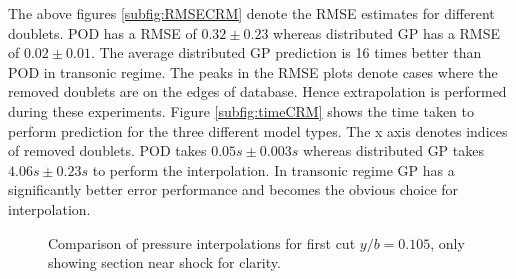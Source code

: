 The above figures \ref{subfig:RMSECRM} denote the RMSE estimates for different doublets. POD has a RMSE of \(0.32\pm0.23\) whereas distributed GP has a RMSE of \(0.02\pm0.01\). The average distributed GP prediction is 16 times better than POD in transonic regime. The peaks in the RMSE plots denote cases where the removed doublets are on the edges of database. Hence extrapolation is performed during these experiments. Figure \ref{subfig:timeCRM} shows the time taken to perform prediction for the three different model types. The x axis denotes indices of removed doublets. POD takes \(0.05s\pm0.003s\) whereas distributed GP takes \(4.06s\pm0.23s\) to perform the interpolation. In transonic regime GP has a significantly better error performance and becomes the obvious choice for interpolation.

\begin{figure}[!ht]
  \centering
  \quad
  \caption{Comparison of pressure interpolations for first cut \(y/b = 0.105\), only showing section near shock for clarity.}
\end{figure}

